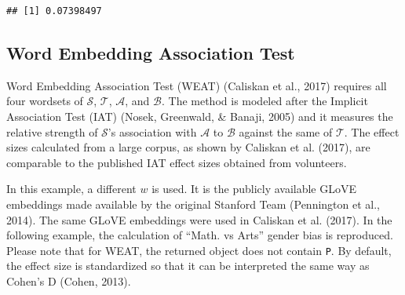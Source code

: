 \documentclass[english,man]{apa6}
\begin{document}
\begin{verbatim}
## [1] 0.07398497
\end{verbatim}

\hypertarget{word-embedding-association-test}{%
\subsection{Word Embedding Association Test}\label{word-embedding-association-test}}

Word Embedding Association Test (WEAT) (Caliskan et al., 2017) requires all four wordsets of \(\mathcal{S}\), \(\mathcal{T}\), \(\mathcal{A}\), and \(\mathcal{B}\). The method is modeled after the Implicit Association Test (IAT) (Nosek, Greenwald, \& Banaji, 2005) and it measures the relative strength of \(\mathcal{S}\)'s association with \(\mathcal{A}\) to \(\mathcal{B}\) against the same of \(\mathcal{T}\). The effect sizes calculated from a large corpus, as shown by Caliskan et al. (2017), are comparable to the published IAT effect sizes obtained from volunteers.

In this example, a different \(w\) is used. It is the publicly available GLoVE embeddings made available by the original Stanford Team (Pennington et al., 2014). The same GLoVE embeddings were used in Caliskan et al. (2017). In the following example, the calculation of \enquote{Math. vs Arts} gender bias is reproduced. Please note that for WEAT, the returned object does not contain \texttt{P}. By default, the effect size is standardized so that it can be interpreted the same way as Cohen's D (Cohen, 2013).
\end{document}
